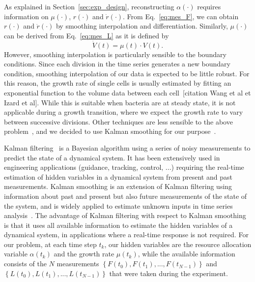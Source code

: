 As explained in Section~\ref{sec:exp_design}, reconstructing $\alpha (\cdot)$ requires information on $\mu (\cdot)$, $r(\cdot)$ and $\dot{r}(\cdot)$.
From Eq.~\ref{eq:mes_F}, we can obtain $r(\cdot)$ and $\dot{r}(\cdot)$ by smoothing interpolation and differentiation.
Similarly, $\mu (\cdot)$ can be derived from Eq.~\ref{eq:mes_L} as it is defined by
\[
\dot{V}(t) = \mu (t) \cdot V(t).
\]
However, smoothing interpolation is particularly sensible to the boundary conditions.
Since each division in the time series generates a new boundary condition, smoothing interpolation of our data is expected to be little robust.
For this reason, the growth rate of single cells is usually estimated by fitting an exponential function to the volume data between each cell~[citation Wang et al et Izard et al].
While this is suitable when bacteria are at steady state, it is not applicable during a growth transition, where we expect the growth rate to vary between successive divisions.
Other techniques are less sensible to the above problem~\cite{zulkower_robust_2015}, and we decided to use Kalman smoothing for our purpose~\cite{kailath_linear_2000,jazwinski_stochastic_2007}.

Kalman filtering~\cite{kalman_new_1960} is a Bayesian algorithm using a series of noisy measurements to predict the state of a dynamical system.
It has been extensively used in engineering applications (guidance, tracking, control, ...) requiring the real-time estimation of hidden variables in a dynamical system from present and past measurements.
Kalman smoothing is an extension of Kalman filtering using information about past and present but also future measurements of the state of the system, and is widely applied to estimate unknown inputs in time series analysis~\cite{kailath_linear_2000,jazwinski_stochastic_2007}.
The advantage of Kalman filtering with respect to Kalman smoothing is that it uses all available information to estimate the hidden variables of a dynamical system, in applications where a real-time response is not required.
For our problem, at each time step $t_k$, our hidden variables are the resource allocation variable $\alpha (t_k)$ and the growth rate $\mu (t_k)$, while the available information consists of the $N$ measurements $\left\{ F(t_0), F(t_1), ..., F(t_{N-1}) \right\}$ and $\left\{L(t_0), L(t_1), ..., L(t_{N-1}) \right\}$ that were taken during the experiment.

